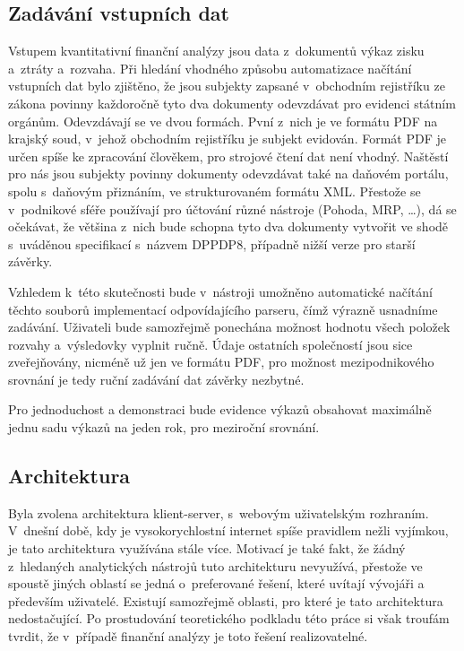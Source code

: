 \subsection{Zadávání vstupních dat}
Vstupem kvantitativní finanční analýzy jsou data z~dokumentů výkaz zisku a~ztráty a~rozvaha. Při hledání vhodného způsobu automatizace načítání vstupních dat bylo zjištěno, že jsou subjekty zapsané v~obchodním rejistříku ze zákona povinny každoročně tyto dva dokumenty odevzdávat pro evidenci státním orgánům. 
Odevzdávají se ve dvou formách. Pvní z~nich je ve formátu PDF na krajský soud, v~jehož obchodním rejistříku je subjekt evidován. Formát PDF je určen spíše ke zpracování člověkem, pro strojové čtení dat není vhodný. Naštěstí pro nás jsou subjekty povinny dokumenty odevzdávat také na daňovém portálu, spolu s~daňovým přiznáním, ve strukturovaném formátu XML. Přestože se v~podnikové sféře používají pro účtování různé nástroje (Pohoda, MRP, \dots), dá se očekávat, že většina z~nich bude schopna tyto dva dokumenty vytvořit ve shodě s~uváděnou specifikací s~názvem DPPDP8, případně nižší verze pro starší závěrky.

Vzhledem k~této skutečnosti bude v~nástroji umožněno automatické načítání těchto souborů implementací odpovídajícího parseru, čímž výrazně usnadníme zadávání. Uživateli bude samozřejmě ponechána možnost hodnotu všech položek rozvahy a~výsledovky vyplnit ručně. Údaje ostatních společností jsou sice zveřejňovány, nicméně už jen ve formátu PDF, pro možnost mezipodnikového srovnání je tedy ruční zadávání dat závěrky nezbytné.

Pro jednoduchost a demonstraci bude evidence výkazů obsahovat maximálně jednu sadu výkazů na jeden rok, pro meziroční srovnání.



\subsection{Architektura}
Byla zvolena architektura klient-server, s~webovým uživatelským rozhraním. V~dnešní době, kdy je vysokorychlostní internet spíše pravidlem nežli vyjímkou, je tato architektura využívána stále více. Motivací je také fakt, že žádný z~hledaných analytických nástrojů tuto architekturu nevyužívá, přestože ve spoustě jiných oblastí se jedná o~preferované řešení, které uvítají vývojáři a především uživatelé. Existují samozřejmě oblasti, pro které je tato architektura nedostačující. Po prostudování teoretického podkladu této práce si však troufám tvrdit, že v~případě finanční analýzy je toto řešení realizovatelné. 

